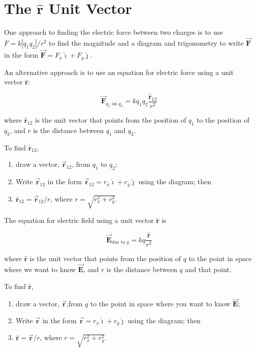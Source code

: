 \documentclass{article}
\newcommand{\ihat}[0]{\hat{\boldsymbol{\imath}}}
\newcommand{\jhat}[0]{\hat{\boldsymbol{\jmath}}}
\newcommand{\rhat}[0]{\hat{\mathbf{r}}}
\newcommand{\bfvec}[1]{\vec{\mathbf{#1}}}
\begin{document}

\section{The $\rhat$ Unit Vector}

One approach to finding the electric force between two charges is to use
$F=k{|q_1q_2|}/{r^2}$ to find the magnitude and a diagram and trigonometry to write $\bfvec{F}$ in the form $\bfvec{F}=F_x\ihat + F_y\jhat$.

An alternative approach is to use an equation for electric force using a unit vector $\rhat$:

$$\bfvec{F}_{q_1\text{ on }q_2}=kq_1q_2\frac{\rhat_{12}}{r^2}$$

where $\rhat_{12}$ is the unit vector that points from the position of $q_1$ to the position of $q_2$, and $r$ is the distance between $q_1$ and $q_2$.

To find $\rhat_{12}$,

\begin{enumerate}

  \item draw a vector, $\bfvec{r}_{12}$, from $q_1$ to $q_2$;

  \item Write $\bfvec{r}_{12}$ in the form $\bfvec{r}_{12}=r_x\ihat+r_y\jhat$ using the diagram; then

  \item $\rhat_{12}=\bfvec{r}_{12}/r$, where $r=\sqrt{r_x^2+r_y^2}$.

\end{enumerate}

The equation for electric field using a unit vector $\rhat$ is

$$\bfvec{E}_{\text{due to }q}=kq\frac{\rhat}{r^2}$$

where $\rhat$ is the unit vector that points from the position of $q$ to the point in space where we want to know $\bfvec{E}$, and $r$ is the distance between $q$ and that point. 

To find $\rhat$, 

\begin{enumerate}

  \item draw a vector, $\bfvec{r}$,from $q$ to the point in space where you want to know $\bfvec{E}$;

  \item Write $\bfvec{r}$ in the form $\bfvec{r}=r_x\ihat+r_y\jhat$ using the diagram; then

  \item $\rhat=\bfvec{r}/r$, where $r=\sqrt{r_x^2+r_y^2}$.

\end{enumerate}
\end{document}
